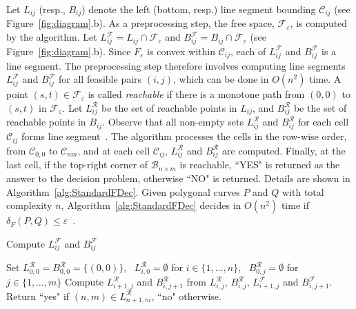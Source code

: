 \documentclass[12pt]{dalthesis}
\newcommand{\lee}{\leqslant}
\newcommand{\set}[1]{{\{ #1 \}}}
\newcommand{\eps}{\varepsilon}
\newcommand{\CF}{{\mathscr F}}
\newcommand{\CR}{{\mathscr R}}
\newcommand{\CB}{{\mathscr B}}
\newcommand{\CC}{{\mathscr C}}
\newcommand{\Frechet}{Fr\'echet }
\newcommand{\distF}{\delta_F}
\newcommand{\cell}[1]{{\CC_{#1}}}
\newcommand{\BNM}{\CB_{n \times m}}
\newcommand{\Feps}{\CF_\eps}
\newcommand{\LF}{L^\CF}
\newcommand{\BF}{B^\CF}
\newcommand{\LR}{L^\CR}
\newcommand{\BR}{B^\CR}
\begin{document}
Let $L_{ij}$ (resp., $B_{ij}$) denote the left (bottom, resp.) line 
segment bounding $\cell{ij}$ (see Figure~\ref{fig:diagram}.b).
As a preprocessing step, the free space, $\Feps$, is computed by the algorithm.
Let $\LF_{ij} = L_{ij} \cap \Feps$ and $\BF_{ij} = B_{ij} \cap \Feps$ 
(see Figure~\ref{fig:diagram}.b).
Since $F_\eps$ is convex within $\cell{ij}$,
each of $\LF_{ij}$ and $\BF_{ij}$ is a line segment. 
The preprocessing step therefore involves computing line segments
$\LF_{ij}$ and $\BF_{ij}$ for all feasible pairs $(i,j)$, which can be done in $O(n^2)$ time.
A point $(s,t) \in \Feps$ is called {\em reachable\/} 
if there is a monotone path from $(0,0)$ to $(s,t)$ in $\Feps$.
Let $\LR_{ij}$ be the set of reachable points in $L_{ij}$,
and $\BR_{ij}$ be the set of reachable points in $B_{ij}$.
Observe that all non-empty sets $\LR_{ij}$ and $\BR_{ij}$ for each cell $\cell{ij}$ forms line 
segment~\cite{AltG95}. The algorithm processes the cells in the row-wise order, from $\cell{0,0}$ to $\cell{nm}$, 
and at each cell $\cell{ij}$, $\LR_{ij}$ and $\BR_{ij}$ are computed. 
Finally, at the last cell, if the top-right corner of $\BNM$ is reachable, 
``YES" is returned as the answer to the decision problem, otherwise ``NO" is returned.
Details are shown in Algorithm~\ref{alg:StandardFDec}. 
Given polygonal curves $P$ and $Q$ with total complexity $n$, 
Algorithm~\ref{alg:StandardFDec} decides in $O(n^2)$ time 
if $\distF(P,Q) \lee \eps$~\cite{AltG95}.






\begin{algorithm} [h]
\caption {\sc Standard \Frechet Decision Algorithm~\cite{AltG95} } \label{alg:StandardFDec}




\begin{algorithmic}[1]
	\vspace{0.5em}
	\baselineskip

		\FOR { each cell $\cell{ij}$ } 
 
 		\STATE Compute $\LF_{ij}$  and $\BF_{ij}$
\ENDFOR

	\STATE Set $\LR_{0,0} = \BR_{0,0} = \set{(0,0)}$, \ 
		$\LR_{i,0} = \emptyset$ for $i \in \set{1, \ldots, n}$, \ 
		$\BR_{0,j} = \emptyset$ for $j \in \set{1, \ldots, m}$  
	\FOR {$i = 0$ to $n$} 
	 	\FOR {$j = 0$ to $m$}
			\STATE Compute  $\LR_{i+1,j}$ and $\BR_{i,j+1}$ from  $\LR_{i,j}$, $\BR_{i,j}$,  $\LF_{i+1,j}$ and $\BF_{i,j+1}$.
		\ENDFOR
	\ENDFOR
	\STATE\label{line:last} Return ``{\sc yes}" if $(n,m) \in \LR_{n+1,m}$, ``{\sc no}" otherwise. 

\end{algorithmic}
\end{algorithm}
\end{document}
